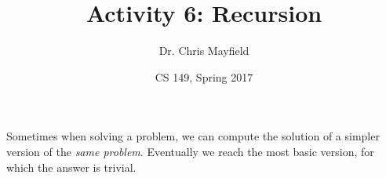 \documentclass[12pt]{article}
\title{Activity 6: Recursion}
\author{Dr. Chris Mayfield}
\date{CS 149, Spring 2017}
\begin{document}
\maketitle

Sometimes when solving a problem, we can compute the solution of a simpler version of the \emph{same problem}.
Eventually we reach the most basic version, for which the answer is trivial.




%
\end{document}
